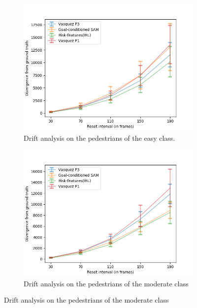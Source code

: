 \begin{figure}[htbp]
	\begin{subfigure}{0.5\textwidth}
		\centering
		\includegraphics[width=\linewidth]{plots/zara02_inter_irl_adjusted_speed/drift_easy_inter_irl_zara02_adjusted.png}
		\caption {Drift analysis on the pedestrians of the easy class.}
		\label{fig:inter_IRL-drift_analysis_easy-zara02}
	\end{subfigure}
	\begin{subfigure}{0.5\textwidth}
		\centering
     	\includegraphics[width=\linewidth]{plots/zara02_inter_irl_adjusted_speed/drift_med_inter_irl_zara02_adjusted.png}
		\caption {Drift analysis on the pedestrians of the moderate class}
		\label{fig:inter_IRL-drift_analysis_med-zara02}

\end{subfigure}
\end{figure}
